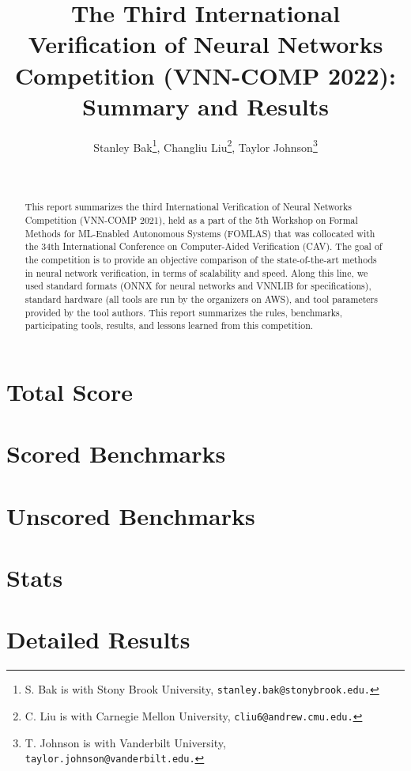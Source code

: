 \documentclass{easychair}
\title{The Third International Verification of Neural Networks Competition (VNN-COMP 2022): Summary and Results%
}
\author{Stanley Bak\thanks{S. Bak is with Stony Brook University, \tt stanley.bak@stonybrook.edu.}, Changliu Liu\thanks{C. Liu is with Carnegie Mellon University, \tt cliu6@andrew.cmu.edu.}, Taylor Johnson\thanks{T. Johnson is with Vanderbilt University, \tt taylor.johnson@vanderbilt.edu.}
}
\institute{
 }
\date{\phantom{date}\\}
\begin{document}
\maketitle

\begin{abstract}
This report summarizes the third International Verification of Neural Networks Competition (VNN-COMP 2021), held as a part of the 5th Workshop on Formal Methods for ML-Enabled Autonomous Systems (FOMLAS) that was collocated with the 34th International Conference on Computer-Aided Verification (CAV).
%
%
The goal of the competition is to provide an objective comparison of the state-of-the-art methods in neural network verification, in terms of scalability and speed.
%
Along this line, we used standard formats (ONNX for neural networks and VNNLIB for specifications), standard hardware (all tools are run by the organizers on AWS), and tool parameters provided by the tool authors.
%
This report summarizes the rules, benchmarks, participating tools, results, and lessons learned from this competition.
\end{abstract}



%
\section{Total Score}


\clearpage
\section{Scored Benchmarks}


\clearpage
\section{Unscored Benchmarks}


\clearpage
\section{Stats}


\clearpage
\section{Detailed Results}

\end{document}
